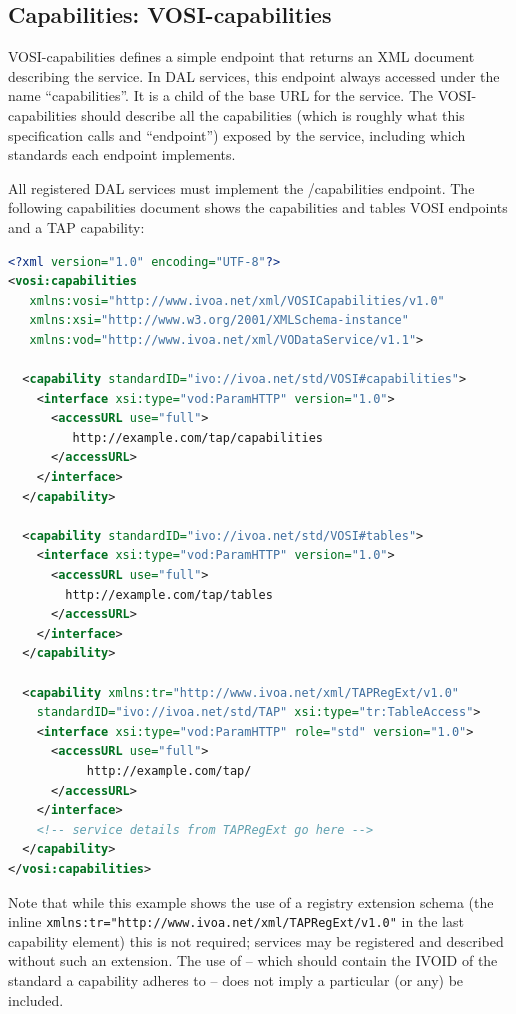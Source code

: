 \documentclass[11pt,letter]{ivoa}
\begin{document}
\subsection{Capabilities: VOSI-capabilities}
\label{sec:vosi-capabilities}
VOSI-capabilities \citep{2017ivoa.spec.0524G} defines a simple endpoint that
returns an XML document
describing the service. In  DAL services, this endpoint always accessed
under the name
``capabilities''.  It is a child of the base URL for the service. The
VOSI-capabilities should describe all the capabilities (which is roughly
what this specification calls and ``endpoint'') exposed by the service,
including which standards each endpoint implements.

All registered DAL services must implement the /capabilities endpoint. The following
capabilities document shows the capabilities and tables VOSI endpoints
and a TAP capability:

\begin{lstlisting}[language=XML,basicstyle=\footnotesize]
<?xml version="1.0" encoding="UTF-8"?>
<vosi:capabilities
   xmlns:vosi="http://www.ivoa.net/xml/VOSICapabilities/v1.0"
   xmlns:xsi="http://www.w3.org/2001/XMLSchema-instance"
   xmlns:vod="http://www.ivoa.net/xml/VODataService/v1.1">

  <capability standardID="ivo://ivoa.net/std/VOSI#capabilities">
    <interface xsi:type="vod:ParamHTTP" version="1.0">
      <accessURL use="full">
         http://example.com/tap/capabilities
      </accessURL>
    </interface>
  </capability>

  <capability standardID="ivo://ivoa.net/std/VOSI#tables">
    <interface xsi:type="vod:ParamHTTP" version="1.0">
      <accessURL use="full">
        http://example.com/tap/tables
      </accessURL>
    </interface>
  </capability>

  <capability xmlns:tr="http://www.ivoa.net/xml/TAPRegExt/v1.0"
    standardID="ivo://ivoa.net/std/TAP" xsi:type="tr:TableAccess">
    <interface xsi:type="vod:ParamHTTP" role="std" version="1.0">
      <accessURL use="full">
           http://example.com/tap/
      </accessURL>
    </interface>
    <!-- service details from TAPRegExt go here -->
  </capability>
</vosi:capabilities>
\end{lstlisting}

Note that while this example shows the use of a registry extension schema (the
inline \verb|xmlns:tr="http://www.ivoa.net/xml/TAPRegExt/v1.0"| in the last capability
element) this is not required; services may be registered and described without
such an extension. The use of  -- which should contain the
IVOID of
the standard a capability adheres to -- does not imply a particular (or any)
 be included.
\end{document}
